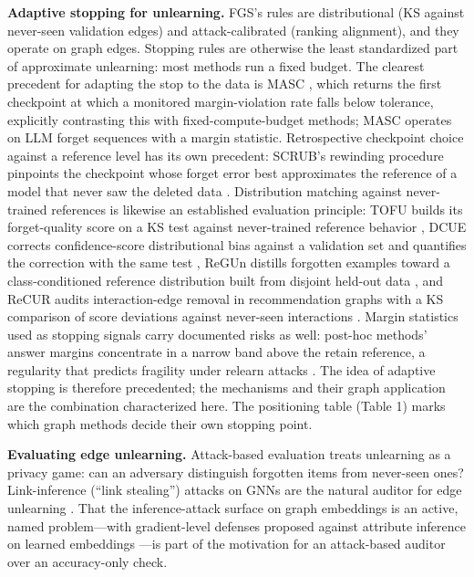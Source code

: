 \documentclass[pdflatex,sn-basic,Numbered]{sn-jnl}
\begin{document}
\textbf{Adaptive stopping for unlearning.} FGS's rules are distributional (KS against never-seen validation edges) and attack-calibrated (ranking alignment), and they operate on graph edges. Stopping rules are otherwise the least standardized part of approximate unlearning: most methods run a fixed budget. The clearest precedent for adapting the stop to the data is MASC \cite{masc2026}, which returns the first checkpoint at which a monitored margin-violation rate falls below tolerance, explicitly contrasting this with fixed-compute-budget methods; MASC operates on LLM forget sequences with a margin statistic. Retrospective checkpoint choice against a reference level has its own precedent: SCRUB's rewinding procedure pinpoints the checkpoint whose forget error best approximates the reference of a model that never saw the deleted data \cite{scrub2023}. Distribution matching against never-trained references is likewise an established evaluation principle: TOFU builds its forget-quality score on a KS test against never-trained reference behavior \cite{tofu2024}, DCUE corrects confidence-score distributional bias against a validation set and quantifies the correction with the same test \cite{dcue2025}, ReGUn distills forgotten examples toward a class-conditioned reference distribution built from disjoint held-out data \cite{regun2026}, and ReCUR audits interaction-edge removal in recommendation graphs with a KS comparison of score deviations against never-seen interactions \cite{recur2026}. Margin statistics used as stopping signals carry documented risks as well: post-hoc methods' answer margins concentrate in a narrow band above the retain reference, a regularity that predicts fragility under relearn attacks \cite{margincliff2026}. The idea of adaptive stopping is therefore precedented; the mechanisms and their graph application are the combination characterized here. The positioning table (Table 1) marks which graph methods decide their own stopping point.

\textbf{Evaluating edge unlearning.} Attack-based evaluation treats unlearning as a privacy game: can an adversary distinguish forgotten items from never-seen ones? Link-inference (``link stealing'') attacks on GNNs are the natural auditor for edge unlearning \cite{utu2024,he2021}. That the inference-attack surface on graph embeddings is an active, named problem---with gradient-level defenses proposed against attribute inference on learned embeddings \cite{pbpr2026}---is part of the motivation for an attack-based auditor over an accuracy-only check.
\end{document}
